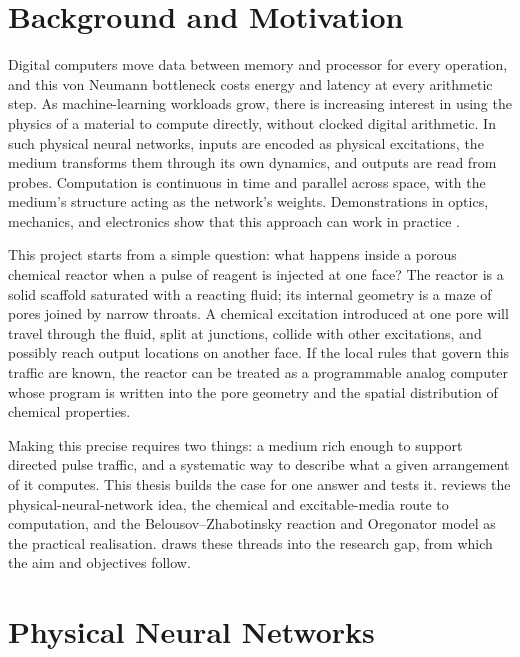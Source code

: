 
\section{Background and Motivation}
\label{sec:background}

Digital computers move data between memory and processor for every operation, and this von Neumann bottleneck costs energy and latency at every arithmetic step.
As machine-learning workloads grow, there is increasing interest in using the physics of a material to compute directly, without clocked digital arithmetic.
In such physical neural networks, inputs are encoded as physical excitations, the medium transforms them through its own dynamics, and outputs are read from probes.
Computation is continuous in time and parallel across space, with the medium's structure acting as the network's weights.
Demonstrations in optics, mechanics, and electronics show that this approach can work in practice \cite{lin2018alloptical, wright2022deep, hughes2019wave}.

This project starts from a simple question: what happens inside a porous chemical reactor when a pulse of reagent is injected at one face?
The reactor is a solid scaffold saturated with a reacting fluid; its internal geometry is a maze of pores joined by narrow throats.
A chemical excitation introduced at one pore will travel through the fluid, split at junctions, collide with other excitations, and possibly reach output locations on another face.
If the local rules that govern this traffic are known, the reactor can be treated as a programmable analog computer whose program is written into the pore geometry and the spatial distribution of chemical properties.

Making this precise requires two things: a medium rich enough to support directed pulse traffic, and a systematic way to describe what a given arrangement of it computes.
This thesis builds the case for one answer and tests it.
 reviews the physical-neural-network idea,  the chemical and excitable-media route to computation, and  the Belousov--Zhabotinsky reaction and Oregonator model as the practical realisation.
 draws these threads into the research gap, from which the aim and objectives follow.

\section{Physical Neural Networks}
\label{sec:lit_pnn}

